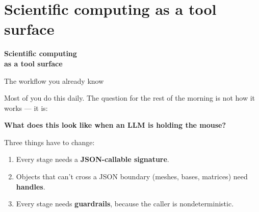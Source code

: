 \documentclass[aspectratio=169,10pt]{beamer}
\newcommand{\hl}[1]{\textcolor{accent}{\textbf{#1}}}
\begin{document}
\section{Scientific computing as a tool surface}

\begin{frame}[plain]
\begin{center}
\Huge\bfseries Scientific computing\\as a tool surface
\end{center}
\end{frame}

\begin{frame}{The workflow you already know}
\begin{center}
\end{center}

\vspace{1em}
Most of you do this daily. The question for the rest of the morning is not
how it works --- it is:

\vspace{0.8em}
\begin{center}\large
\hl{What does this look like when an LLM is holding the mouse?}
\end{center}

\vspace{1em}
Three things have to change:
\begin{enumerate}\itemsep3pt
  \item Every stage needs a \textbf{JSON-callable signature}.
  \item Objects that can't cross a JSON boundary (meshes, bases, matrices) need
        \textbf{handles}.
  \item Every stage needs \textbf{guardrails}, because the caller is nondeterministic.
\end{enumerate}
\end{frame}
\end{document}
